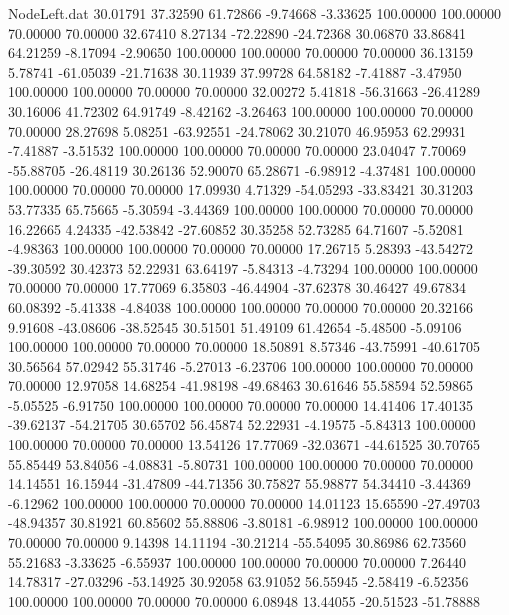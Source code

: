 \begin{filecontents}{NodeLeft.dat}
  30.01791   37.32590   61.72866    -9.74668   -3.33625  100.00000  100.00000   70.00000   70.00000   32.67410    8.27134  -72.22890  -24.72368
  30.06870   33.86841   64.21259    -8.17094   -2.90650  100.00000  100.00000   70.00000   70.00000   36.13159    5.78741  -61.05039  -21.71638
  30.11939   37.99728   64.58182    -7.41887   -3.47950  100.00000  100.00000   70.00000   70.00000   32.00272    5.41818  -56.31663  -26.41289
  30.16006   41.72302   64.91749    -8.42162   -3.26463  100.00000  100.00000   70.00000   70.00000   28.27698    5.08251  -63.92551  -24.78062
  30.21070   46.95953   62.29931    -7.41887   -3.51532  100.00000  100.00000   70.00000   70.00000   23.04047    7.70069  -55.88705  -26.48119
  30.26136   52.90070   65.28671    -6.98912   -4.37481  100.00000  100.00000   70.00000   70.00000   17.09930    4.71329  -54.05293  -33.83421
  30.31203   53.77335   65.75665    -5.30594   -3.44369  100.00000  100.00000   70.00000   70.00000   16.22665    4.24335  -42.53842  -27.60852
  30.35258   52.73285   64.71607    -5.52081   -4.98363  100.00000  100.00000   70.00000   70.00000   17.26715    5.28393  -43.54272  -39.30592
  30.42373   52.22931   63.64197    -5.84313   -4.73294  100.00000  100.00000   70.00000   70.00000   17.77069    6.35803  -46.44904  -37.62378
  30.46427   49.67834   60.08392    -5.41338   -4.84038  100.00000  100.00000   70.00000   70.00000   20.32166    9.91608  -43.08606  -38.52545
  30.51501   51.49109   61.42654    -5.48500   -5.09106  100.00000  100.00000   70.00000   70.00000   18.50891    8.57346  -43.75991  -40.61705
  30.56564   57.02942   55.31746    -5.27013   -6.23706  100.00000  100.00000   70.00000   70.00000   12.97058   14.68254  -41.98198  -49.68463
  30.61646   55.58594   52.59865    -5.05525   -6.91750  100.00000  100.00000   70.00000   70.00000   14.41406   17.40135  -39.62137  -54.21705
  30.65702   56.45874   52.22931    -4.19575   -5.84313  100.00000  100.00000   70.00000   70.00000   13.54126   17.77069  -32.03671  -44.61525
  30.70765   55.85449   53.84056    -4.08831   -5.80731  100.00000  100.00000   70.00000   70.00000   14.14551   16.15944  -31.47809  -44.71356
  30.75827   55.98877   54.34410    -3.44369   -6.12962  100.00000  100.00000   70.00000   70.00000   14.01123   15.65590  -27.49703  -48.94357
  30.81921   60.85602   55.88806    -3.80181   -6.98912  100.00000  100.00000   70.00000   70.00000    9.14398   14.11194  -30.21214  -55.54095
  30.86986   62.73560   55.21683    -3.33625   -6.55937  100.00000  100.00000   70.00000   70.00000    7.26440   14.78317  -27.03296  -53.14925
  30.92058   63.91052   56.55945    -2.58419   -6.52356  100.00000  100.00000   70.00000   70.00000    6.08948   13.44055  -20.51523  -51.78888

\end{filecontents}
